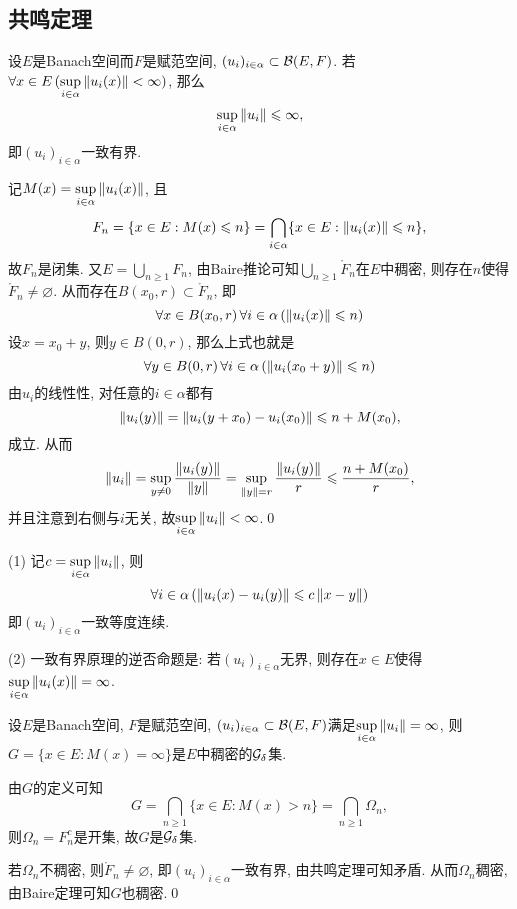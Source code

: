 	\subsection{共鸣定理}
	\begin{Theorem}
	设$ E $是Banach空间而$ F $是赋范空间, $ (u_i)_{i\in\alpha}\subset\mathcal{B}(E,F) $. 若$ \forall x\in E\,(\sup\limits_{i\in\alpha}\left\| u_i(x) \right\|<\infty) $, 那么
	\[
	\sup_{i\in\alpha}\left\| u_i \right\|\leqslant\infty,
	\]
	即$ (u_i)_{i\in\alpha} $一致有界.
	\end{Theorem}
	\begin{Proof}
	记$ M(x)=\sup\limits_{i\in\alpha}\left\| u_i(x) \right\| $, 且
	\[
	F_n=\{ x\in E : M(x)\leqslant n \}=\bigcap_{i\in\alpha}\{ x\in E : \left\| u_i(x) \right\|\leqslant n \},
	\]
	故$ F_n $是闭集. 又$ E=\bigcup_{n\geqslant 1}F_n $, 由Baire推论可知$ \bigcup_{n\geqslant 1}\mathring{F}_n $在$ E $中稠密, 则存在$ n $使得$ \mathring{F}_n\ne\varnothing $. 从而存在$ B(x_0,r)\subset\mathring{F}_n $, 即
	\[
	\forall x\in B(x_0,r)\,\forall i\in\alpha\,(\left\| u_i(x) \right\|\leqslant n)
	\]
	设$ x=x_0+y $, 则$ y\in B(0,r) $, 那么上式也就是
	\[
	\forall y\in B(0,r)\,\forall i\in\alpha\,(\left\| u_i(x_0+y) \right\|\leqslant n)
	\]
	由$ u_i $的线性性, 对任意的$ i\in\alpha $都有
	\[
	\left\| u_i(y) \right\|=\left\| u_i(y+x_0)-u_i(x_0) \right\|\leqslant n+M(x_0),
	\]
	成立. 从而
	\[
	\left\| u_i \right\|=\sup_{y\ne 0}\frac{\left\| u_i(y) \right\|}{\left\| y \right\|}=\sup_{\left\| y \right\|=r}\frac{\left\| u_i(y) \right\|}{r}\leqslant\frac{n+M(x_0)}{r},
	\]
	并且注意到右侧与$ i $无关, 故$ \sup\limits_{i\in\alpha}\left\| u_i \right\|<\infty $.\qed
	\end{Proof}
	\begin{Remark}
	(1) 记$ c=\sup\limits_{i\in\alpha}\left\| u_i \right\| $, 则
	\[
	\forall i\in\alpha\,(\left\| u_i(x)-u_i(y) \right\|\leqslant c\left\| x-y \right\|)
	\]
	即$ (u_i)_{i\in\alpha} $一致等度连续.
	
	(2) 一致有界原理的逆否命题是: 若$ (u_i)_{i\in\alpha} $无界, 则存在$ x\in E $使得$ \sup\limits_{i\in\alpha}\left\| u_i(x) \right\|=\infty $.
	\end{Remark}
	
	\begin{Theorem}
	设$ E $是Banach空间, $ F $是赋范空间, $ (u_i)_{i\in\alpha}\subset\mathcal{B}(E,F) $满足$ \sup\limits_{i\in\alpha}\left\| u_i \right\|=\infty $, 则$ G=\{ x\in E: M(x)=\infty \} $是$ E $中稠密的$ \mathcal{G}_{\delta} $集.
	\end{Theorem}
	\begin{Proof}
	由$ G $的定义可知
	\[
	G=\bigcap_{n\geqslant 1}\{ x\in E : M(x)>n \}=\bigcap_{n\geqslant 1}\varOmega_n,
	\]
	则$ \varOmega_n=F_n^c $是开集, 故$ G $是$ \mathcal{G}_{\delta} $集.
	
	若$ \varOmega_n $不稠密, 则$ \mathring{F}_n\ne\varnothing $, 即$ (u_i)_{i\in\alpha} $一致有界, 由共鸣定理可知矛盾. 从而$ \varOmega_n $稠密, 由Baire定理可知$ G $也稠密.\qed
	\end{Proof}
	
